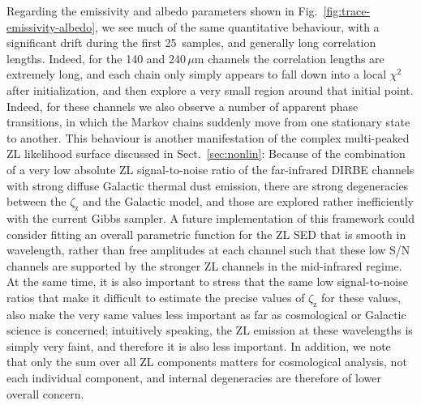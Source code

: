 \documentclass[twocolumn]{aa}
\begin{document}
Regarding the emissivity and albedo parameters shown in
Fig.~\ref{fig:trace-emissivity-albedo}, we see much of the same
quantitative behaviour, with a significant drift during the first
25~samples, and generally long correlation lengths. Indeed, for the
140 and 240\,$\mu$m channels the correlation lengths are extremely
long, and each chain only simply appears to fall down into a local
$\chi^2$ after initialization, and then explore a very small region
around that initial point. Indeed, for these channels we also observe
a number of apparent phase transitions, in which the Markov chains
suddenly move from one stationary state to another. This behaviour is
another manifestation of the complex multi-peaked ZL likelihood
surface discussed in Sect.~\ref{sec:nonlin}: Because of the
combination of a very low absolute ZL signal-to-noise ratio of the
far-infrared DIRBE channels with strong diffuse Galactic thermal dust
emission, there are strong degeneracies between the
$\zeta_{\mathrm{z}}$ and the Galactic model, and those are explored
rather inefficiently with the current Gibbs sampler. A future
implementation of this framework could consider fitting an overall
parametric function for the ZL SED that is smooth in wavelength,
rather than free amplitudes at each channel such that these low S/N
channels are supported by the stronger ZL channels in the mid-infrared
regime. At the same time, it is also important to stress that the same
low signal-to-noise ratios that make it difficult to estimate the
precise values of $\zeta_{\mathrm{z}}$ for these values, also make the
very same values less important as far as cosmological or Galactic
science is concerned; intuitively speaking, the ZL emission at these
wavelengths is simply very faint, and therefore it is also less
important. In addition, we note that only the sum over all ZL
components matters for cosmological analysis, not each individual
component, and internal degeneracies are therefore of lower overall
concern.
\end{document}
